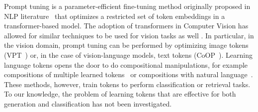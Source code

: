 Prompt tuning is a parameter-efficient fine-tuning method originally proposed in NLP literature~\cite{liuPretrainPromptPredict2021} that optimizes a restricted set of token embeddings in a transformer-based model. The adoption of transformers in Computer Vision has allowed for similar techniques to be used for vision tasks as well \cite{jiaVisualPromptTuning2022, zhou2022coop, wang2022learning}. In particular, in the vision domain, prompt tuning can be performed by optimizing image tokens (VPT~\cite{jiaVisualPromptTuning2022}) or, in the case of vision-language models, text tokens (CoOP~\cite{zhou2022coop}). Learning language tokens opens the door to do compositional manipulations, for example compositions of multiple learned tokens~\cite{nayakLearningComposeSoft2022} or compositions with natural language~\cite{saitoPic2WordMappingPictures2023, cohenThisMyUnicorn2022a}. These methods, however, train tokens to perform classification or retrieval tasks. To our knowledge, the problem of learning tokens that are effective for both generation and classification has not been investigated.





